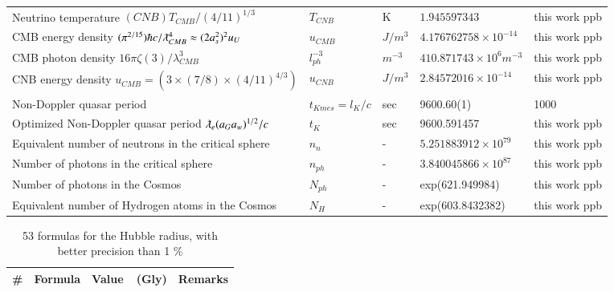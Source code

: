 \documentclass[a4paper,9pt]{article}
\begin{document}
\begin{appendix}
\begin{table}
\begin{tabular}{lllll}
   
   Neutrino temperature  $(CNB)T_{CMB}/ (4/11)^{1/3}$ & $T_{CNB}$ & K & $1.945597343$ & this work ppb \\ 
   CMB energy density $(\pi^{2/15})\hbar c/ \lambdabar_{CMB}^4 \approx (2a_s^2)^2 u_U$ & $u_{CMB}$ & $J/m^3$ & $4.176762758 \times 10^{-14}$ & this work ppb\\ 
   CMB photon density $16 \pi \zeta (3)/\lambda_{CMB}^3$  & $l_{ph}^{-3}$  & $m^{-3}$   & $410.871743 \times 10^6 m^{-3}$ & this work ppb \\ 
   CNB energy density $u_{CMB} = (3\times (7/8) \times (4/11)^{4/3})$ & $u_{CNB}$ & $J/m^3$ & $2.84572016\times 10^{-14}$ & this work ppb \\  
   Non-Doppler quasar period & $t_{Kmes} = l_K/c$ & sec & 9600.60(1) & 1000 \\  
   Optimized Non-Doppler quasar period $\lambdabar_e (a_Ga_w)^{1/2}/c$ & $t_{K}$ & sec & 9600.591457 & this work ppb \\ 
   Equivalent number of neutrons in the critical sphere & $n_n$ & - & $5.251883912 \times 10^{79}$ & this work ppb \\ 
   Number of photons in the critical sphere  & $n_{ph}$ & - & $3.840045866 \times 10^{87}$ & this work ppb \\ 
   Number of photons in the Cosmos  & $N_{ph}$ & - & exp(621.949984) & this work ppb \\ 
   Equivalent number of Hydrogen atoms in the Cosmos  & $N_H$ & - & exp(603.8432382) & this work ppb \\
 \bottomrule
  \end{tabular}
\end{table}
 

\begin{table}
\caption{53 formulas for the Hubble radius, with better precision than 1 \%}
\label{tab:4:table4}
  \hskip-2.0cm\begin{tabular}{llll}
    \toprule
    \cmidrule(r){1-4}
   \#     & Formula     & Value~~(Gly) & Remarks \\
    \midrule
    

\end{tabular}
\end{table}
\end{appendix}
\end{document}
